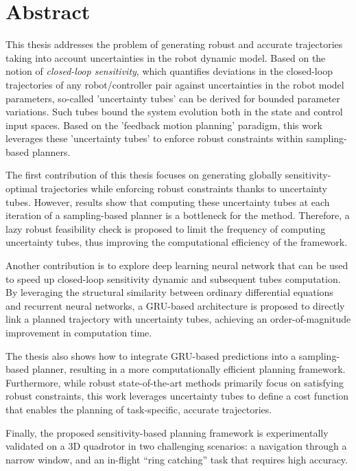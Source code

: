 \chapter*{Abstract}

This thesis addresses the problem of generating robust and accurate trajectories taking into account uncertainties in the robot dynamic model. 
Based on the notion of \emph{closed-loop sensitivity}, which quantifies deviations in the closed-loop trajectories of any robot/controller pair against uncertainties in the robot model parameters, so-called 'uncertainty tubes' can be derived for bounded parameter variations.
Such tubes bound the system evolution both in the state and control input spaces.
Based on the 'feedback motion planning' paradigm, this work leverages these 'uncertainty tubes' to enforce robust constraints within sampling-based planners.

The first contribution of this thesis focuses on generating globally sensitivity-optimal trajectories while enforcing robust constraints thanks to uncertainty tubes.
However, results show that computing these uncertainty tubes at each iteration of a sampling-based planner is a bottleneck for the method.
Therefore, a lazy robust feasibility check is proposed to limit the frequency of computing uncertainty tubes, thus improving the computational efficiency of the framework.

Another contribution is to explore deep learning neural network that can be used to speed up closed-loop sensitivity dynamic and subsequent tubes computation.
By leveraging the structural similarity between ordinary differential equations and recurrent neural networks, a GRU-based architecture is proposed to directly link a planned trajectory with uncertainty tubes, achieving an order-of-magnitude improvement in computation time.

The thesis also shows how to integrate GRU-based predictions into a sampling-based planner, resulting in a more computationally efficient planning framework. 
Furthermore, while robust state-of-the-art methods primarily focus on satisfying robust constraints, this work leverages uncertainty tubes to define a cost function that enables the planning of task-specific, accurate trajectories.

Finally, the proposed sensitivity-based planning framework is experimentally validated on a 3D quadrotor in two challenging scenarios: a navigation through a narrow window, and an in-flight ``ring catching'' task that requires high accuracy. 